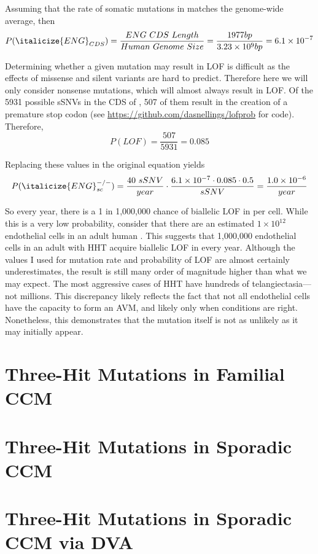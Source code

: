 Assuming that the rate of somatic mutations in  matches the genome-wide average, then 
\begin{equation*}
P(\italicize{ENG}_{CDS}) = \frac{ENG~CDS~Length}{Human~Genome~Size} = \frac{1977 bp}{3.23 \times 10^9 bp} = 6.1 \times 10^{-7}
\end{equation*}

Determining whether a given mutation may result in LOF is difficult as the effects of missense and silent variants are hard to predict. Therefore here we will only consider nonsense mutations, which will almost always result in LOF. Of the 5931 possible sSNVs in the CDS of , 507 of them result in the creation of a premature stop codon (see \url{https://github.com/dasnellings/lofprob} for code). Therefore,
\begin{equation*}
P(LOF) = \frac{507}{5931} = 0.085
\end{equation*}

Replacing these values in the original equation yields
\begin{equation*}
P(\italicize{ENG}_{sc}^{-/-}) = \frac{40~sSNV}{year} \cdot \frac{6.1 \times 10^{-7} \cdot 0.085 \cdot 0.5}{sSNV} = \frac{1.0 \times 10^{-6}}{year}
\end{equation*}

So every year, there is a 1 in 1,000,000 chance of biallelic LOF in  per cell. While this is a very low probability, consider that there are an estimated $1 \times 10^{12}$ endothelial cells in an adult human \citep{jaffe1987}. This suggests that 1,000,000 endothelial cells in an adult with HHT acquire biallelic LOF in  every year. Although the values I used for mutation rate and probability of LOF are almost certainly underestimates, the result is still many order of magnitude higher than what we may expect. The most aggressive cases of HHT have hundreds of telangiectasia---not millions. This discrepancy likely reflects the fact that not all endothelial cells have the capacity to form an AVM, and likely only when conditions are right. Nonetheless, this demonstrates that the mutation itself is not as unlikely as it may initially appear. 

\section{Three-Hit Mutations in Familial CCM}

\section{Three-Hit Mutations in Sporadic CCM}

\section{Three-Hit Mutations in Sporadic CCM via DVA}










